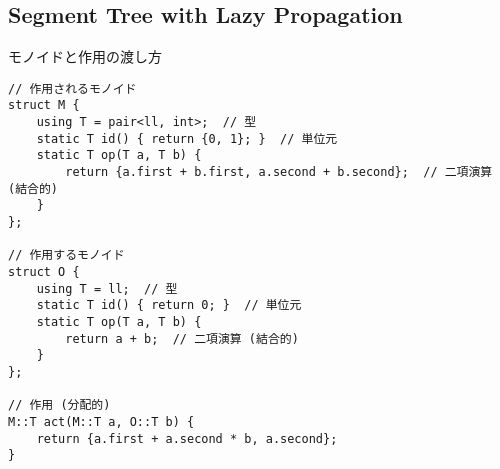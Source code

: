 \subsection{Segment Tree with Lazy Propagation}

\begin{small}
モノイドと作用の渡し方
\begin{lstlisting}
// 作用されるモノイド
struct M {
    using T = pair<ll, int>;  // 型
    static T id() { return {0, 1}; }  // 単位元
    static T op(T a, T b) {
        return {a.first + b.first, a.second + b.second};  // 二項演算 (結合的)
    }
};

// 作用するモノイド
struct O {
    using T = ll;  // 型
    static T id() { return 0; }  // 単位元
    static T op(T a, T b) {
        return a + b;  // 二項演算 (結合的)
    }
};

// 作用 (分配的)
M::T act(M::T a, O::T b) {
    return {a.first + a.second * b, a.second};
}

\end{lstlisting}

\end{small}


